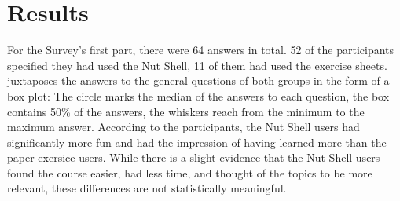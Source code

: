 \documentclass[paper=a4,twoside,abstract=on,cleardoublepage=empty,numbers=noenddot,toc=bib,12pt,appendixprefix=true]{scrreprt}
\begin{document}
\section{Results}

For the Survey's first part, there were 64 answers in total. 52 of the participants specified they had used the Nut Shell, 11 of them had used the exercise sheets.  juxtaposes the answers to the general questions of both groups in the form of a box plot: The circle marks the median of the answers to each question, the box contains 50\% of the answers, the whiskers reach from the minimum to the maximum answer. According to the participants, the Nut Shell users had significantly more fun and had the impression of having learned more than the paper exersice users. While there is a slight evidence that the Nut Shell users found the course easier, had less time, and thought of the topics to be more relevant, these differences are not statistically meaningful.
\end{document}
